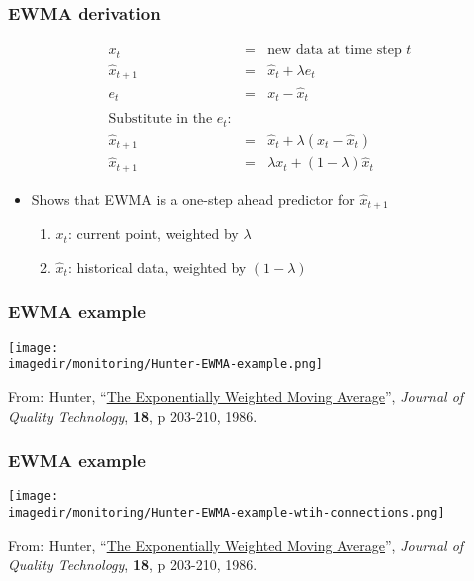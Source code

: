 \begin{frame}\frametitle{EWMA derivation}

	$$
	\begin{array}{rcl}
		x_t &=& \text{new data at time step } t\\
		\hat{x}_{t+1} &=& \hat{x}_{t} + \lambda e_{t} \\
		e_t &=& x_t - \hat{x}_t \\
		\\
		\text{Substitute in the}\,\, e_t:\\		
		\hat{x}_{t+1} &=& \hat{x}_{t} + \lambda \left(x_t - \hat{x}_t\right) \\
		\hat{x}_{t+1} &=& \lambda x_t + \left(1-\lambda \right)\hat{x}_{t}
	\end{array}
	$$
	
	\vspace{12pt}
	\begin{itemize}
		\item	Shows that EWMA is a one-step ahead predictor for $\hat{x}_{t+1}$
		\begin{enumerate}
			\item	$x_t$: current point, weighted by $\lambda$
			\item	$\hat{x}_{t}$: historical data, weighted by $\left(1-\lambda \right)$
		\end{enumerate}
	\end{itemize}
\end{frame}

\begin{frame}\frametitle{EWMA example}
	\begin{center}
		\texttt{[image: \\imagedir/monitoring/Hunter-EWMA-example.png]}
	\end{center}
	\vspace{6pt}
	From: Hunter, ``\href{http://literature.connectmv.com/item/175/the-exponentially-weighted-moving-average}{The Exponentially Weighted Moving Average}'', \emph{Journal of Quality Technology}, \textbf{18}, p 203-210, 1986.
\end{frame}

\begin{frame}\frametitle{EWMA example}
	\begin{center}
		\texttt{[image: \\imagedir/monitoring/Hunter-EWMA-example-wtih-connections.png]}
	\end{center}
	\vspace{6pt}
	From: Hunter, ``\href{http://literature.connectmv.com/item/175/the-exponentially-weighted-moving-average}{The Exponentially Weighted Moving Average}'', \emph{Journal of Quality Technology}, \textbf{18}, p 203-210, 1986.
\end{frame}

